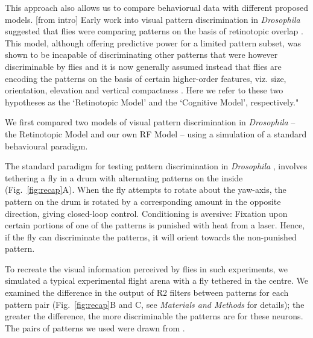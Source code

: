 
This approach also allows us to compare behaviorual data 
with different proposed models.  [from intro] Early work into visual pattern discrimination in \emph{Drosophila} suggested that flies were comparing patterns on the basis of retinotopic overlap \cite{Dill1995,Dill1993}.
This model, although offering predictive power for a limited pattern subset, was shown to be incapable of discriminating other patterns that were however discriminable by flies \cite{Ernst1999} and it is now generally assumed instead that flies are encoding the patterns on the basis of certain higher-order features, viz. size, orientation, elevation and vertical compactness \cite{Ernst1999,Liu2006,Pan2009}.
Here we refer to these two hypotheses as the `Retinotopic Model' and the `Cognitive Model', respectively."


We first compared two models of visual pattern discrimination in \emph{Drosophila} -- the Retinotopic Model \cite{Dill1995,Dill1993} and our own RF Model -- using a simulation of a standard behavioural paradigm.

The standard paradigm for testing pattern discrimination in \emph{Drosophila} \cite{Pan2009,Liu2006,Ernst1999,Dill1993}, involves tethering a fly in a drum with alternating patterns on the inside (Fig.~\ref{fig:recap}A).
When the fly attempts to rotate about the yaw-axis, the pattern on the drum is rotated by a corresponding amount in the opposite direction, giving closed-loop control.
Conditioning is aversive: Fixation upon certain portions of one of the patterns is punished with heat from a laser.
Hence, if the fly can discriminate the patterns, it will orient towards the non-punished pattern.

To recreate the visual information perceived by flies in such experiments, we simulated a typical experimental flight arena with a fly tethered in the centre.
We examined the difference in the output of R2 filters between patterns for each pattern pair (Fig.~\ref{fig:recap}B and C, see \emph{Materials and Methods} for details); the greater the difference, the more discriminable the patterns are for these neurons.
The pairs of patterns we used were drawn from \cite{Ernst1999}. 


